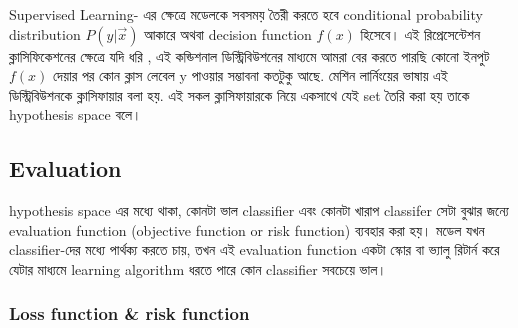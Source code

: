 \documentclass[graybox, envcountchap, twocolumn]{styles/svmult}
\begin{document}
\bengalifont
Supervised Learning- এর ক্ষেত্রে মডেলকে সবসময় তৈরী করতে হবে conditional probability distribution $P(y|\vec{x})$ আকারে অথবা decision function $f(x)$ হিসেবে।  এই রিপ্রেসেন্টেশন
ক্লাসিফিকেশনের ক্ষেত্রে যদি ধরি , এই কন্ডিশনাল ডিস্ট্রিবিউশনের মাধ্যমে আমরা বের করতে পারছি কোনো ইনপুট  $f(x)$ দেয়ার পর কোন ক্লাস লেবেল y পাওয়ার সম্ভাবনা কতটুকু আছে. মেশিন লার্নিংয়ের ভাষায় এই ডিস্ট্রিবিউশনকে ক্লাসিফায়ার বলা হয়. এই সকল ক্লাসিফায়ারকে নিয়ে একসাথে যেই set তৈরি করা হয় তাকে hypothesis space বলে। 



\subsection{Evaluation}
{\bengalifont
hypothesis space এর মধ্যে থাকা, কোনটা ভাল classifier এবং কোনটা খারাপ classifer সেটা বুঝার জন্যে evaluation function (objective function or risk function) ব্যবহার করা হয়। মডেল যখন classifier-দের মধ্যে পার্থক্য করতে চায়, তখন এই evaluation function একটা স্কোর বা ভ্যালু রিটার্ন করে যেটার মাধ্যমে learning algorithm ধরতে পারে কোন classifier সবচেয়ে ভাল।}


\subsubsection{Loss function \& risk function}
\label{sec:Loss-function-and-risk-function}
\end{document}
